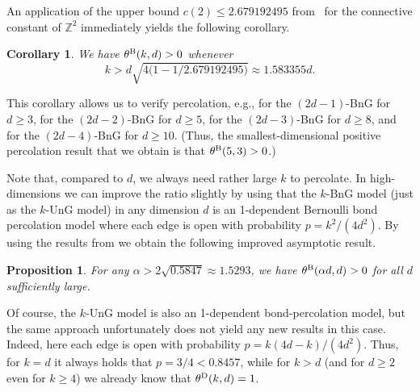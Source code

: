 \documentclass[a4paper, oneside, 11pt]{amsart}
\newtheorem{corollary}[theorem]{Corollary}
\newtheorem{prop}[theorem]{Proposition}
\theoremstyle{definition}
\newcommand{\1}{\mathbbm{1}}
\newcommand{\0}{\mathbf{o}}
\newcommand{\Z}{\mathbb{Z}}
\newcommand*{\be}{\begin{equation}}
\newcommand*{\ee}{\end{equation}}
\numberwithin{equation}{section}
\begin{document}
An application of the upper bound $c(2)\leq 2.679192495$ from~\cite{PonTitt00} for the connective constant of $\Z^2$ immediately yields the following corollary. 
\begin{corollary}\label{cor-Bperc}
We have $\theta^{\rm B}(k,d) > 0$ whenever 
\be 
 k>d\sqrt{4\Big(1-1/2.679192495\Big)}\approx 1.583355
d.
\ee 
\end{corollary}

This corollary allows us to verify percolation, e.g., for the $(2d-1)$-BnG for $d \geq 3$, for the $(2d-2)$-BnG for $d \geq 5$, for the $(2d-3)$-BnG for $d \geq 8$, and for the $(2d-4)$-BnG for $d \geq 10$. (Thus, the smallest-dimensional positive percolation result that we obtain is that $\theta^{\rm B}(5,3) >0$.)

Note that, compared to $d$, we always need rather large $k$ to percolate. In high-dimensions we can improve the ratio slightly by using that the $k$-BnG model (just as the $k$-UnG model) in any dimension $d$ is an 1-dependent Bernoulli bond percolation model where each edge is open with probability $p=k^2/(4d^2)$. By using the results from \cite{improvedLB} we obtain the following improved asymptotic result. 

\begin{prop}\label{prop-1indep}
For any $\alpha > 2 \sqrt{0.5847} \approx 1.5293$, we have $\theta^{\rm B}(\alpha d, d)>0$ for all $d$ sufficiently large.
\end{prop}

Of course, the $k$-UnG model is also an 1-dependent bond-percolation model, but the same approach unfortunately does not yield any new results in this case. Indeed, here each edge is open with probability $p=k(4d-k)/(4d^2)$. Thus, for $k=d$ it always holds that $p=3/4<0.8457$, while for $k>d$ (and for $d \geq 2$ even for $k \geq 4$) we already know that $\theta^{\rm D}(k,d)=1$. 
\end{document}
